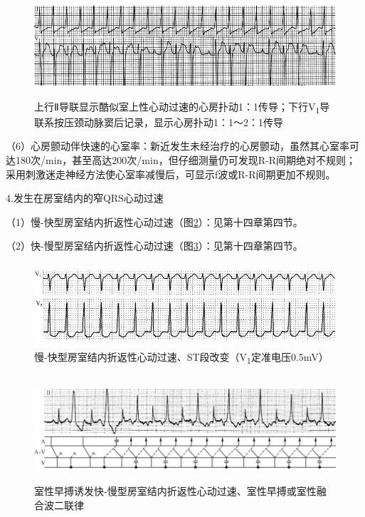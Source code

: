 \begin{figure}[!htbp]
 \centering
 \includegraphics[width=5.58333in,height=1.47917in]{./images/Image00523.jpg}
 \captionsetup{justification=centering}
 \caption{上行Ⅱ导联显示酷似室上性心动过速的心房扑动1：1传导；下行V\textsubscript{1}导联系按压颈动脉窦后记录，显示心房扑动1：1～2：1传导}
 \label{fig32-7}
  \end{figure} 


（6）心房颤动伴快速的心室率：新近发生未经治疗的心房颤动，虽然其心室率可达180次/min，甚至高达200次/min，但仔细测量仍可发现R-R间期绝对不规则；采用刺激迷走神经方法使心室率减慢后，可显示f波或R-R间期更加不规则。

4.发生在房室结内的窄QRS心动过速

（1）慢-快型房室结内折返性心动过速（图\ref{fig32-8}）：见第十四章第四节。

（2）快-慢型房室结内折返性心动过速（图\ref{fig32-9}）：见第十四章第四节。

\begin{figure}[!htbp]
 \centering
 \includegraphics[width=5.34375in,height=1.22917in]{./images/Image00524.jpg}
 \captionsetup{justification=centering}
 \caption{慢-快型房室结内折返性心动过速、ST段改变（V\textsubscript{1}定准电压0.5mV）}
 \label{fig32-8}
  \end{figure} 


\begin{figure}[!htbp]
 \centering
 \includegraphics[width=5.77083in,height=1.53125in]{./images/Image00525.jpg}
 \captionsetup{justification=centering}
 \caption{室性早搏诱发快-慢型房室结内折返性心动过速、室性早搏或室性融合波二联律}
 \label{fig32-9}
  \end{figure} 

